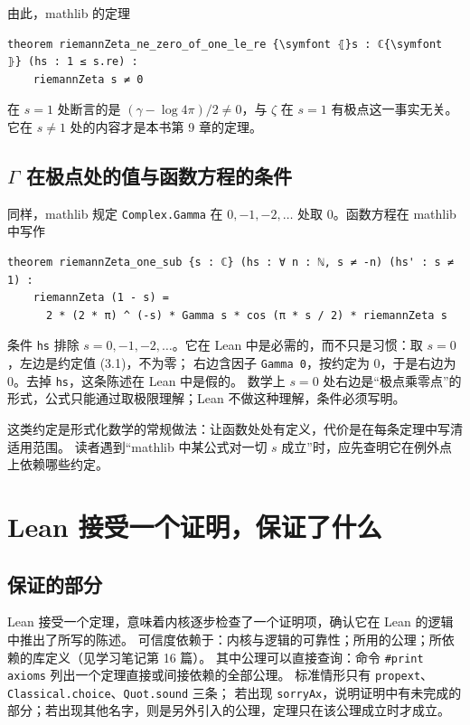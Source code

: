 \documentclass[11pt]{article}
\begin{document}
由此，mathlib 的定理
\begin{Verbatim}[commandchars=\\\{\}]
theorem riemannZeta_ne_zero_of_one_le_re {\symfont ⦃}s : ℂ{\symfont ⦄} (hs : 1 ≤ s.re) :
    riemannZeta s ≠ 0
\end{Verbatim}
在 $s=1$ 处断言的是 $(\gamma-\log4\pi)/2\ne0$，与 $\zeta$ 在 $s=1$ 有极点这一事实无关。它在 $s\ne1$ 处的内容才是本书第 9 章的定理。

\subsection{$\Gamma$ 在极点处的值与函数方程的条件}
同样，mathlib 规定 \texttt{Complex.Gamma} 在 $0,-1,-2,\dots$ 处取 $0$。函数方程在 mathlib 中写作
\begin{Verbatim}
theorem riemannZeta_one_sub {s : ℂ} (hs : ∀ n : ℕ, s ≠ -n) (hs' : s ≠ 1) :
    riemannZeta (1 - s) =
      2 * (2 * π) ^ (-s) * Gamma s * cos (π * s / 2) * riemannZeta s
\end{Verbatim}
条件 \texttt{hs} 排除 $s=0,-1,-2,\dots$。它在 Lean 中是必需的，而不只是习惯：取 $s=0$，左边是约定值 (3.1)，不为零；
右边含因子 \texttt{Gamma 0}，按约定为 $0$，于是右边为 $0$。去掉 \texttt{hs}，这条陈述在 Lean 中是假的。
数学上 $s=0$ 处右边是“极点乘零点”的形式，公式只能通过取极限理解；Lean 不做这种理解，条件必须写明。

这类约定是形式化数学的常规做法：让函数处处有定义，代价是在每条定理中写清适用范围。
读者遇到“mathlib 中某公式对一切 $s$ 成立”时，应先查明它在例外点上依赖哪些约定。

\section{Lean 接受一个证明，保证了什么}
\subsection{保证的部分}
Lean 接受一个定理，意味着内核逐步检查了一个证明项，确认它在 Lean 的逻辑中推出了所写的陈述。
可信度依赖于：内核与逻辑的可靠性；所用的公理；所依赖的库定义（见学习笔记第 16 篇）。
其中公理可以直接查询：命令 \texttt{\#print axioms} 列出一个定理直接或间接依赖的全部公理。
标准情形只有 \texttt{propext}、\texttt{Classical.choice}、\texttt{Quot.sound} 三条；
若出现 \texttt{sorryAx}，说明证明中有未完成的部分；若出现其他名字，则是另外引入的公理，定理只在该公理成立时才成立。
\end{document}
